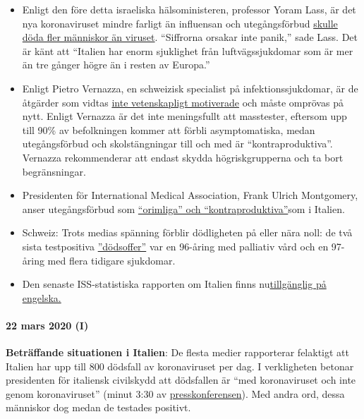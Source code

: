 \begin{itemize}
\tightlist
\item
  Enligt den före detta israeliska hälsoministeren, professor Yoram
  Lass, är det nya koronaviruset mindre farligt än influensan och
  utegångsförbud
  \href{https://en.globes.co.il/en/article-lockdown-lunacy-1001322696}{skulle
  döda fler människor än viruset}. ``Siffrorna orsakar inte panik,''
  sade Lass. Det är känt att ``Italien har enorm sjuklighet från
  luftvägssjukdomar som är mer än tre gånger högre än i resten av
  Europa.''
\item
  Enligt Pietro Vernazza, en schweizisk specialist på
  infektionssjukdomar, är de åtgärder som vidtas
  \href{https://www.tagblatt.ch/leben/ostschweizer-infektiologe-pietro-vernazza-die-zahlen-zu-den-jungen-corona-virus-erkrankten-sind-irrefuehrend-ld.1206440}{inte
  vetenskapligt motiverade} och måste omprövas på nytt. Enligt Vernazza
  är det inte meningsfullt att masstester, eftersom upp till 90\% av
  befolkningen kommer att förbli asymptomatiska, medan utegångsförbud
  och skolstängningar till och med är ``kontraproduktiva''. Vernazza
  rekommenderar att endast skydda högriskgrupperna och ta bort
  begränsningar.
\item
  Presidenten för International Medical Association, Frank Ulrich
  Montgomery, anser utegångsförbud som
  \href{https://www.general-anzeiger-bonn.de/news/politik/deutschland/interview-mit-weltaerztepraesident-montgomery-ueber-corona-pandemie-ist-chaos_aid-49609561}{``orimliga''
  och ``kontraproduktiva''}som i Italien.
\item
  Schweiz: Trots medias spänning förblir dödligheten på eller nära noll:
  de två sista testpositiva
  \href{https://www.bluewin.ch/de/newsregional/zuerich/1068-bestatigte-corona-falle-und-funf-todesfalle-im-kanton-zurich-371873.html}{''dödsoffer''}
  var en 96-åring med palliativ vård och en 97-åring med flera tidigare
  sjukdomar.
\item
  Den senaste ISS-statistiska rapporten om Italien finns
  nu\href{https://www.epicentro.iss.it/coronavirus/bollettino/Report-COVID-2019_20_marzo_eng.pdf}{tillgänglig
  på engelska.}
\end{itemize}

\hypertarget{22-mars-2020-i}{%
\paragraph{22 mars 2020 (I)}\label{22-mars-2020-i}}

\textbf{Beträffande situationen i Italien}: De flesta medier rapporterar
felaktigt att Italien har upp till 800 dödsfall av koronaviruset per
dag. I verkligheten betonar presidenten för italiensk civilskydd att
dödsfallen är ``med koronaviruset och inte genom koronaviruset'' (minut
3:30 av \href{https://youtu.be/0M4kbPDHGR0?t=210}{presskonferensen}).
Med andra ord, dessa människor dog medan de testades positivt.

